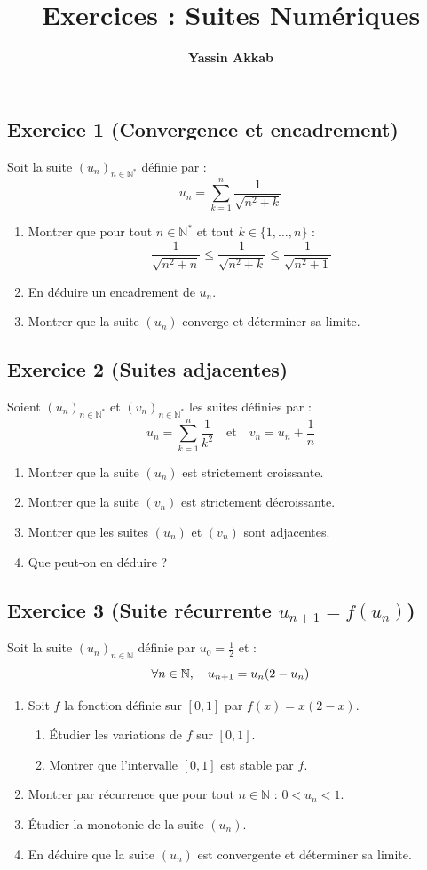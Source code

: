 \documentclass{article}
\title{\textbf{Exercices : Suites Numériques}}
\author{\textbf{Yassin Akkab}}
\begin{document}
	
	\maketitle
	
	\subsection*{Exercice 1 (Convergence et encadrement)}
	Soit la suite $(u_n)_{n \in \mathbb{N}^*}$ définie par :
	\[ u_n = \sum_{k=1}^n \frac{1}{\sqrt{n^2 + k}} \]
	\begin{enumerate}
		\item Montrer que pour tout $n \in \mathbb{N}^*$ et tout $k \in \{1, \dots, n\}$ :
		\[ \frac{1}{\sqrt{n^2 + n}} \le \frac{1}{\sqrt{n^2 + k}} \le \frac{1}{\sqrt{n^2 + 1}} \]
		\item En déduire un encadrement de $u_n$.
		\item Montrer que la suite $(u_n)$ converge et déterminer sa limite.
	\end{enumerate}
	
	\subsection*{Exercice 2 (Suites adjacentes)}
	Soient $(u_n)_{n \in \mathbb{N}^*}$ et $(v_n)_{n \in \mathbb{N}^*}$ les suites définies par :
	\[ u_n = \sum_{k=1}^n \frac{1}{k^2} \quad \text{et} \quad v_n = u_n + \frac{1}{n} \]
	\begin{enumerate}
		\item Montrer que la suite $(u_n)$ est strictement croissante.
		\item Montrer que la suite $(v_n)$ est strictement décroissante.
		\item Montrer que les suites $(u_n)$ et $(v_n)$ sont adjacentes.
		\item Que peut-on en déduire ?
	\end{enumerate}
	
	\subsection*{Exercice 3 (Suite récurrente $u_{n+1} = f(u_n)$)}
	Soit la suite $(u_n)_{n \in \mathbb{N}}$ définie par $u_0 = \frac{1}{2}$ et :
	\[ \qcq{n}{N}, \quad u_{n+1} = u_n (2 - u_n) \]
	\begin{enumerate}
		\item Soit $f$ la fonction définie sur $[0, 1]$ par $f(x) = x(2-x)$. 
		\begin{enumerate}
			\item Étudier les variations de $f$ sur $[0, 1]$.
			\item Montrer que l'intervalle $[0, 1]$ est stable par $f$.
		\end{enumerate}
		\item Montrer par récurrence que pour tout $n \in \mathbb{N}$ : $0 < u_n < 1$.
		\item Étudier la monotonie de la suite $(u_n)$.
		\item En déduire que la suite $(u_n)$ est convergente et déterminer sa limite.
	\end{enumerate}
	
\end{document}
